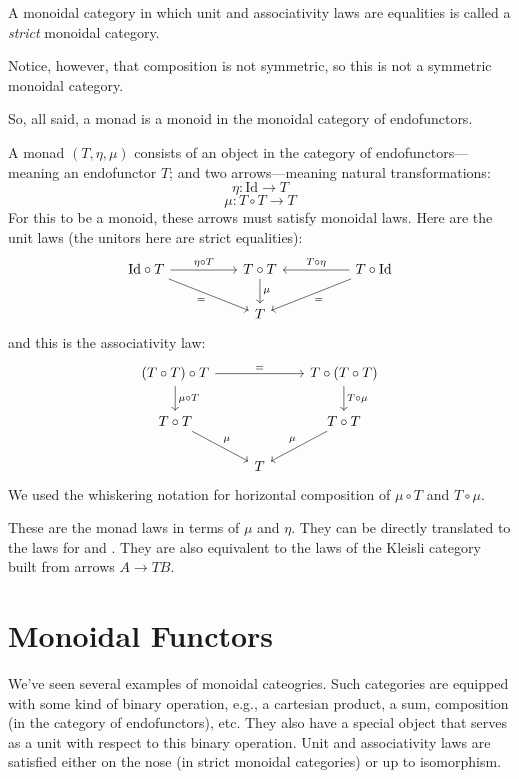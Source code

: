 \documentclass[DaoFP]{subfiles}
\begin{document}
A monoidal category in which unit and associativity laws are equalities is called a \emph{strict} monoidal category.

Notice, however, that composition is not symmetric, so this is not a symmetric monoidal category.

So, all said, a monad is a monoid in the monoidal category of endofunctors. 

A monad $(T, \eta, \mu)$ consists of an object in the category of endofunctors---meaning an endofunctor $T$; and two arrows---meaning natural transformations:
\[ \eta \colon \text{Id} \to T \]
\[ \mu \colon T \circ T \to T \]
For this to be a monoid, these arrows must satisfy monoidal laws. Here are the unit laws (the unitors here are strict equalities):
\[
 \begin{tikzcd}
\text{Id} \circ T
 \arrow[rr, "\eta \circ T"]
 \arrow[rrd, "="']
& & T \circ T
 \arrow[d, "\mu"]
&& T \circ \text{Id}
 \arrow[ll, "T \circ \eta"']
 \arrow[lld, "="]
 \\
 && T
  \end{tikzcd}
\]
and this is the associativity law:
\[
 \begin{tikzcd}
 (T \circ T) \circ T 
 \arrow[rr, "="]
 \arrow[d, "\mu \circ T"]
 &&
 T \circ (T \circ T)
 \arrow[d, "T \circ \mu"]
 \\
 T \circ T 
 \arrow[dr, "\mu"]
& & T \circ T
 \arrow[dl, "\mu"']
 \\
&  T
 \end{tikzcd}
\]
We used the whiskering notation for horizontal composition of $\mu \circ T$ and $T \circ \mu$.

These are the monad laws in terms of $\mu$ and $\eta$. They can be directly translated to the laws for  and . They are also equivalent to the laws of the Kleisli category built from arrows $A \to T B$.

\section{Monoidal Functors}

We've seen several examples of monoidal cateogries. Such categories are equipped with some kind of binary operation, e.g., a cartesian product, a sum, composition (in the category of endofunctors), etc. They also have a special object that serves as a unit with respect to this binary operation. Unit and associativity laws are satisfied either on the nose (in strict monoidal categories) or up to isomorphism.
\end{document}
